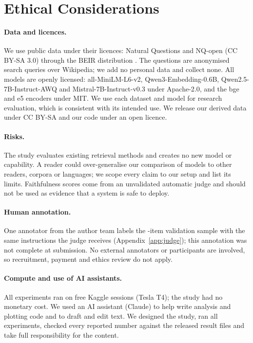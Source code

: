 \section*{Ethical Considerations}
\label{sec:ethics}

\paragraph{Data and licences.}
We use public data under their licences: Natural Questions and NQ-open (CC BY-SA 3.0) through the BEIR distribution \citep{thakur2021beir}.
The questions are anonymised search queries over Wikipedia; we add no personal data and collect none.
All models are openly licensed: all-MiniLM-L6-v2, Qwen3-Embedding-0.6B, Qwen2.5-7B-Instruct-AWQ and Mistral-7B-Instruct-v0.3 under Apache-2.0, and the bge and e5 encoders under MIT.
We use each dataset and model for research evaluation, which is consistent with its intended use.
We release our derived data under CC BY-SA and our code under an open licence.

\paragraph{Risks.}
The study evaluates existing retrieval methods and creates no new model or capability.
A reader could over-generalise our comparison of models to other readers, corpora or languages; we scope every claim to our setup and list its limits.
Faithfulness scores come from an unvalidated automatic judge and should not be used as evidence that a system is safe to deploy.

\paragraph{Human annotation.}
One annotator from the author team labels the -item validation sample with the same instructions the judge receives (Appendix~\ref{app:judge}); this annotation was not complete at submission.
No external annotators or participants are involved, so recruitment, payment and ethics review do not apply.

\paragraph{Compute and use of AI assistants.}
All experiments ran on free Kaggle sessions (Tesla T4); the study had no monetary cost.
We used an AI assistant (Claude) to help write analysis and plotting code and to draft and edit text.
We designed the study, ran all experiments, checked every reported number against the released result files and take full responsibility for the content.

